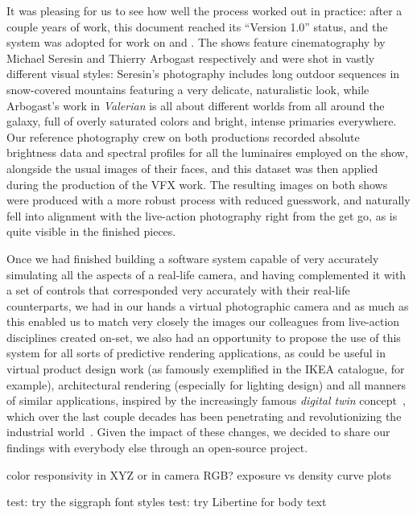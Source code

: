 It was pleasing for us to see how well the process worked out in practice: 
after a couple years of work, this document reached its ``Version 1.0'' status, 
and the system was adopted for work on \cite{wfpota2017} and \cite{valerian2017}. 
The shows feature cinematography by Michael Seresin and Thierry Arbogast respectively and were shot 
in vastly different visual styles: Seresin's photography includes long outdoor sequences in 
snow-covered mountains featuring a very delicate, naturalistic look, while Arbogast's work 
in \emph{Valerian} is all about different worlds from all around the galaxy, full of 
overly saturated colors and bright, intense primaries everywhere.
Our reference photography crew on both productions recorded absolute brightness data and spectral profiles
for all the luminaires employed on the show, alongside the usual images of their faces, and this dataset
was then applied during the production of the \gls{VFX} work. 
The resulting images on both shows were produced with a more robust process with reduced guesswork, 
and naturally fell into alignment with the live-action photography right from the get go, as is quite
visible in the finished pieces.





Once we had finished building a software system capable of very accurately simulating 
all the aspects of a real-life camera, and having complemented it with a set of controls
that corresponded very accurately with their real-life counterparts, we had in our hands 
a virtual photographic camera and as much as this enabled us to match very
closely the images our colleagues from live-action disciplines created on-set,
we also had an opportunity to propose the use of this system for all sorts of predictive rendering applications,
as could be useful in virtual product design work (as famously exemplified in the IKEA catalogue, for example),
architectural rendering (especially for lighting design) and all manners of similar applications,
inspired by the increasingly famous \emph{digital twin} concept~\cite{gelernter91},
which over the last couple decades has been penetrating and revolutionizing the
industrial world~\cite{grieves02}.
Given the impact of these changes, we decided to share our findings with everybody else through an
open-source project.



\ifomit


color responsivity in XYZ or in camera RGB?
exposure vs density curve plots




test: try the siggraph font styles
test: try Libertine for body text

\fi